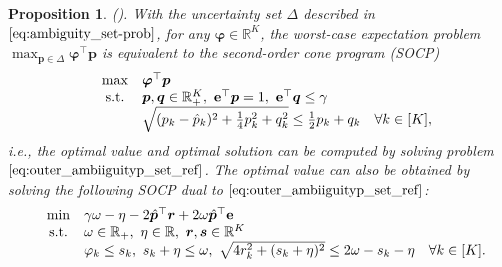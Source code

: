 \documentclass{article}
\newcommand{\st}{\textnormal{s.t.}}
\newcommand{\RR}{\mathbb{R}}
\newtheorem{proposition}{Proposition}
\begin{document}
\begin{proposition} \textup{(\cite[Theorem 4.1]{delta-reformulation}).} \label{prop3}
With the uncertainty set $\Delta$ described in $\eqref{eq:ambiguity_set-prob}$, for any $\bm \varphi \in \RR^K$, the worst-case expectation problem $\max_{\bm p \in \Delta} \bm \varphi^\top \bm p$ is equivalent to the second-order cone program (SOCP)
\begin{equation}
\label{eq:outer_ambiiguityp_set_ref}
\begin{array}{ccll}
& \displaystyle \max &  \bm \varphi^\top \bm p \\
& \st & \bm p, \bm q \in \RR^{K}_{+}, \ \mathbf{e}^\top \bm p  = 1, \ \mathbf{e}^\top \bm q \leq \gamma \\
& & \sqrt{(p_k -  \hat{p}_k)^2 + \frac{1}{4}p_k^2 + q_k^2} \leq \frac{1}{2}p_k + q_k \quad \forall  k \in [K],
\end{array}
\end{equation}
i.e., the optimal value and optimal solution can be computed by solving problem $\eqref{eq:outer_ambiiguityp_set_ref}$. The optimal value can also be obtained by solving the following SOCP dual to $\eqref{eq:outer_ambiiguityp_set_ref}$:
\begin{equation*}
\begin{array}{ccll}
& \displaystyle \min &  \gamma \omega - \eta - 2\hat{\bm p}^\top \bm r + 2\omega\hat{\bm p}^\top \mathbf{e} \\
& \st & \omega \in \RR_{+}, \ \eta \in \RR, \ \bm r, \bm s \in \RR^{K}\\
& & \varphi_k \leq s_k, \ s_k + \eta \leq \omega, 
\ \sqrt{4r_k^2 + (s_k +  \eta)^2} \leq 2\omega - s_k -\eta \quad \forall  k \in [K].
\end{array}
\end{equation*}
\end{proposition}
\end{document}
